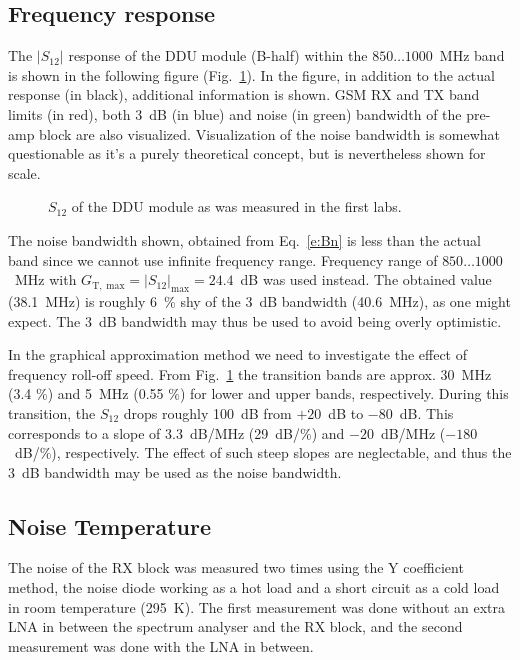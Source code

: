 \documentclass[a4paper, 12pt]{article}
\begin{document}
\newpage
\subsection{Frequency response}

The $|S_{12}|$ response of the DDU module (B-half) within the $850 \ldots 1000$~MHz band 
is shown in the following figure (Fig.~\ref{f:s12}). In the figure, in addition to the 
actual response (in black), additional information is shown. GSM RX and TX band limits 
(in red), both 3~dB (in blue) and noise (in green) bandwidth of the pre-amp block are also 
visualized. Visualization of the noise bandwidth is somewhat questionable as it's a purely 
theoretical concept, but is nevertheless shown for scale. 

\begin{figure}[h!]
	\begin{center}
	\caption{$S_{12}$ of the DDU module as was measured in the first labs.}
	\label{f:s12}
	\end{center}
	\vspace*{-12pt}
\end{figure}

The noise bandwidth shown, obtained from Eq.~\ref{e:Bn} is less than the actual band since 
we cannot use infinite frequency range. Frequency range of $850 \ldots 1000$~MHz with
$G_\mathrm{T,\;max} = |S_{12}|_\mathrm{max} = 24.4$~dB was used instead. The obtained 
value (38.1~MHz) is roughly 6~\% shy of the 3~dB bandwidth (40.6~MHz), as one might expect.
The 3~dB bandwidth may thus be used to avoid being overly optimistic.

In the graphical approximation method we need to investigate the effect of frequency 
roll-off speed. From Fig.~\ref{f:s12} the transition bands are approx. 30~MHz (3.4 \%) 
and 5~MHz (0.55 \%) for lower and upper bands, respectively. During this transition, 
the $S_12$ drops roughly 100~dB from $+20$~dB to $-80$~dB. This corresponds to a slope 
of $3.3$~dB/MHz (29~dB/\%) and $-20$~dB/MHz ($-180$~dB/\%), respectively. The effect of 
such steep slopes are neglectable, and thus the 3~dB bandwidth may be used as the noise 
bandwidth.


\subsection{Noise Temperature}

\noindent
The noise of the RX block was measured two times using the Y coefficient method, the noise diode
working as a hot load and a short circuit as a cold load in room temperature (295~K). The first 
measurement was done without an extra LNA in between the spectrum analyser and the RX block, and 
the second measurement was done with the LNA in between.
\end{document}
